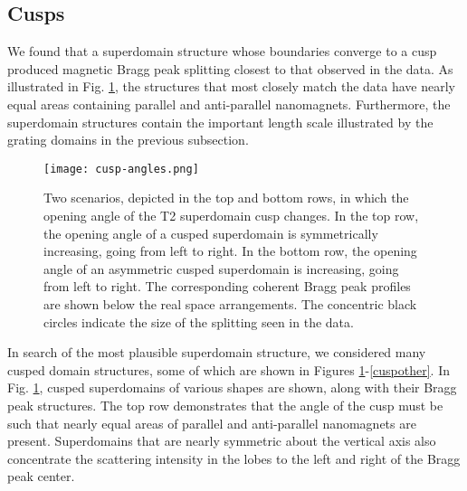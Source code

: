 \documentclass[aps, prb, reprint, showpacs, superscriptaddress]{revtex4-1}
\begin{document}

	\subsection{Cusps}
We found that a superdomain structure whose boundaries converge to a cusp produced magnetic Bragg peak splitting closest to that observed in the data.
As illustrated in Fig. \ref{cuspangles}, the structures that most closely match the data have nearly equal areas containing parallel and anti-parallel nanomagnets. 
Furthermore, the superdomain structures contain the important length scale illustrated by the grating domains in the previous subsection.

\begin{figure}[ht]
\begin{center}
\texttt{[image: cusp-angles.png]}
\caption {
Two scenarios, depicted in the top and bottom rows, in which the opening angle of the T2 superdomain cusp changes. 
In the top row, the opening angle of a cusped superdomain is symmetrically increasing, going from left to right. 
In the bottom row, the opening angle of an asymmetric cusped superdomain is increasing, going from left to right.
The corresponding coherent Bragg peak profiles are shown below the real space arrangements. 
The concentric black circles indicate the size of the splitting seen in the data. 
}  \label{cuspangles}
\end{center}
\end{figure}

In search of the most plausible superdomain structure, we considered many cusped domain structures, some of which are shown in Figures \ref{cuspangles}-\ref{cuspother}. 
In Fig. \ref{cuspangles}, cusped superdomains of various shapes are shown, along with their Bragg peak structures. 
The top row demonstrates that the angle of the cusp must be such that nearly equal areas of parallel and anti-parallel nanomagnets are present.
Superdomains that are nearly symmetric about the vertical axis also concentrate the scattering intensity in the lobes to the left and right of the Bragg peak center.
\end{document}
